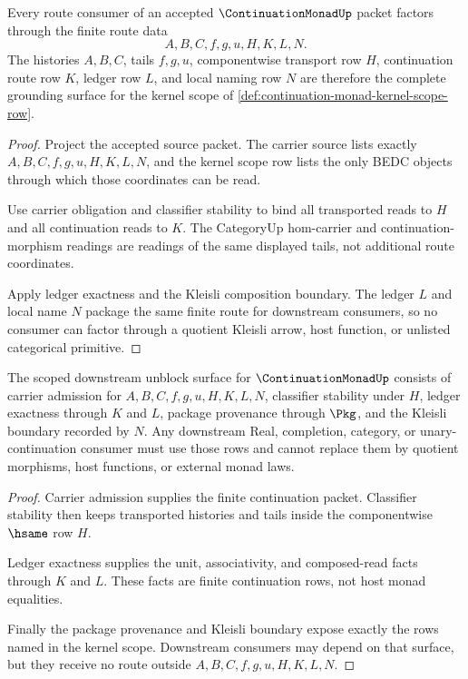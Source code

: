 \begin{theorem}
\label{thm:continuation-monad-route-row-grounding}
Every route consumer of an accepted $\ContinuationMonadUp$ packet factors through the finite route data
$$
A,B,C,f,g,u,H,K,L,N.
$$
The histories $A,B,C$, tails $f,g,u$, componentwise transport row $H$, continuation route row $K$, ledger row $L$, and local naming row $N$ are therefore the complete grounding surface for the kernel scope of \autoref{def:continuation-monad-kernel-scope-row}.
\end{theorem}
\begin{proof}
Project the accepted source packet. The carrier source lists exactly $A,B,C,f,g,u,H,K,L,N$, and the kernel scope row lists the only BEDC objects through which those coordinates can be read.

Use carrier obligation and classifier stability to bind all transported reads to $H$ and all continuation reads to $K$. The CategoryUp hom-carrier and continuation-morphism readings are readings of the same displayed tails, not additional route coordinates.

Apply ledger exactness and the Kleisli composition boundary. The ledger $L$ and local name $N$ package the same finite route for downstream consumers, so no consumer can factor through a quotient Kleisli arrow, host function, or unlisted categorical primitive.
\end{proof}

\begin{theorem}
\label{thm:continuation-monad-downstream-unblock-surface}
The scoped downstream unblock surface for $\ContinuationMonadUp$ consists of carrier admission for $A,B,C,f,g,u,H,K,L,N$, classifier stability under $H$, ledger exactness through $K$ and $L$, package provenance through $\Pkg$, and the Kleisli boundary recorded by $N$. Any downstream Real, completion, category, or unary-continuation consumer must use those rows and cannot replace them by quotient morphisms, host functions, or external monad laws.
\end{theorem}
\begin{proof}
Carrier admission supplies the finite continuation packet. Classifier stability then keeps transported histories and tails inside the componentwise $\hsame$ row $H$.

Ledger exactness supplies the unit, associativity, and composed-read facts through $K$ and $L$. These facts are finite continuation rows, not host monad equalities.

Finally the package provenance and Kleisli boundary expose exactly the rows named in the kernel scope. Downstream consumers may depend on that surface, but they receive no route outside $A,B,C,f,g,u,H,K,L,N$.
\end{proof}

